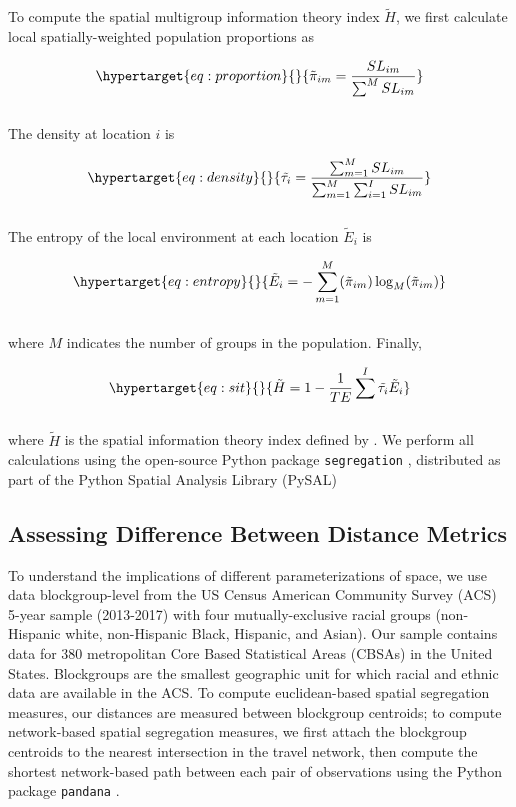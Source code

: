 \documentclass[
  10pt,
]{article}
\begin{document}
To compute the spatial multigroup information theory index
\(\tilde{H}\), we first calculate local spatially-weighted population
proportions as

\begin{equation}\protect\hypertarget{eq:proportion}{}{ \tilde{\pi}_{im} = \frac{SL_{im}}{\sum^M{SL_{im}}} }\label{eq:proportion}\end{equation}\\
The density at location \(i\) is

\begin{equation}\protect\hypertarget{eq:density}{}{ \tilde{\tau_i} = \frac{\sum^M_{m=1}{SL_{im}}}{\sum^M_{m=1}\sum^I_{i=1}{SL_{im}}} }\label{eq:density}\end{equation}\\
The entropy of the local environment at each location \(\tilde{E}_i\) is

\begin{equation}\protect\hypertarget{eq:entropy}{}{ \tilde{E}_i = -\sum^M_{m=1}(\tilde{\pi}_{im})\log_M(\tilde{\pi}_{im}) }\label{eq:entropy}\end{equation}\\
where \(M\) indicates the number of groups in the population. Finally,

\begin{equation}\protect\hypertarget{eq:sit}{}{ \tilde{H} = 1-\frac{1}{TE} \sum^I \tilde{\tau_i}\tilde{E}_i }\label{eq:sit}\end{equation}\\
where \(\tilde{H}\) is the spatial information theory index defined by
\citet{reardon2004MeasuresSpatial}. We perform all calculations using
the open-source Python package \texttt{segregation}
\citep{cortes2020OpensourceFramework}, distributed as part of the Python
Spatial Analysis Library (PySAL) \citep{rey2021PySALEcosystem}

\hypertarget{assessing-difference-between-distance-metrics}{%
\subsection{Assessing Difference Between Distance
Metrics}\label{assessing-difference-between-distance-metrics}}

To understand the implications of different parameterizations of space,
we use data blockgroup-level from the US Census American Community
Survey (ACS) 5-year sample (2013-2017) with four mutually-exclusive
racial groups (non-Hispanic white, non-Hispanic Black, Hispanic, and
Asian). Our sample contains data for 380 metropolitan Core Based
Statistical Areas (CBSAs) in the United States. Blockgroups are the
smallest geographic unit for which racial and ethnic data are available
in the ACS. To compute euclidean-based spatial segregation measures, our
distances are measured between blockgroup centroids; to compute
network-based spatial segregation measures, we first attach the
blockgroup centroids to the nearest intersection in the travel network,
then compute the shortest network-based path between each pair of
observations using the Python package \texttt{pandana}
\citep{foti2012GeneralizedComputational}.
\end{document}
